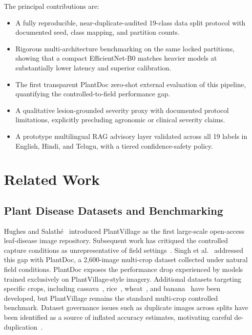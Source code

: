 \documentclass[conference]{IEEEtran}
\begin{document}
The principal contributions are:
\begin{itemize}
    \item A fully reproducible, near-duplicate-audited 19-class data split
          protocol with documented seed, class mapping, and partition counts.
    \item Rigorous multi-architecture benchmarking on the same locked partitions,
          showing that a compact EfficientNet-B0 matches heavier models at
          substantially lower latency and superior calibration.
    \item The first transparent PlantDoc zero-shot external evaluation of this
          pipeline, quantifying the controlled-to-field performance gap.
    \item A qualitative lesion-grounded severity proxy with documented protocol
          limitations, explicitly precluding agronomic or clinical severity claims.
    \item A prototype multilingual RAG advisory layer validated across all 19
          labels in English, Hindi, and Telugu, with a tiered confidence-safety policy.
\end{itemize}

\section{Related Work}

\subsection{Plant Disease Datasets and Benchmarking}

Hughes and Salathé~\cite{hughes2015open} introduced PlantVillage as the first
large-scale open-access leaf-disease image repository. Subsequent work has
critiqued the controlled capture conditions as unrepresentative of field
settings~\cite{mohanty2016deep,sladojevic2016deep,barbedo2018factors,barbedo2019plant}.
Singh et al.~\cite{singh2020plantdoc} addressed this gap with PlantDoc, a
2,600-image multi-crop dataset collected under natural field conditions.
PlantDoc exposes the performance drop experienced by models trained exclusively
on PlantVillage-style imagery. Additional datasets targeting specific crops,
including cassava~\cite{mwebaze2019icassava,ramcharan2017deep}, rice~\cite{prajapati2017analysis},
wheat~\cite{zhang2020crop}, and banana~\cite{magnier2021detection} have been
developed, but PlantVillage remains the standard multi-crop controlled benchmark.
Dataset governance issues such as duplicate images across splits have been
identified as a source of inflated accuracy estimates, motivating careful
de-duplication~\cite{cheng2021fabricated,northcutt2021pervasive,barz2020we}.
\end{document}
